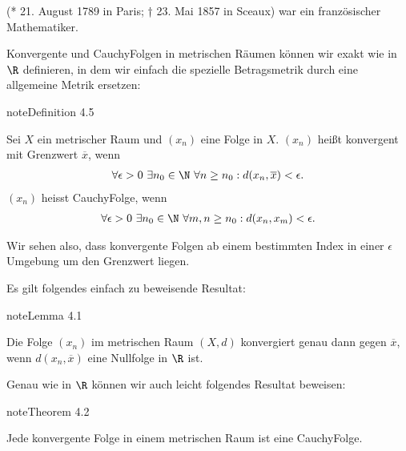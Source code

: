 \documentclass[letterpaper,10pt,english]{jupyterBook}
\begin{document}
\begin{sphinxShadowBox}

 (* 21. August 1789 in Paris; † 23. Mai 1857 in Sceaux) war ein französischer Mathematiker.
\end{sphinxShadowBox}

Konvergente und Cauchy\sphinxhyphen{}Folgen in metrischen Räumen können wir exakt wie in \(\R\) definieren, in dem wir einfach die spezielle Betragsmetrik durch eine allgemeine Metrik ersetzen:
\label{metrik/konvfolgen:definition-4}
\begin{sphinxadmonition}{note}{Definition 4.5}



Sei \(X\) ein metrischer Raum und \((x_n)\) eine Folge in \(X\). \((x_n)\) heißt konvergent mit Grenzwert \(\overline{x}\), wenn
\begin{equation*}
\begin{split} \forall \epsilon  >0 ~\exists n_0 \in \N ~\forall n \geq n_0: d(x_n, \overline{x}) < \epsilon.\end{split}
\end{equation*}
\((x_n)\) heisst Cauchy\sphinxhyphen{}Folge, wenn
\begin{equation*}
\begin{split} \forall \epsilon  >0 ~\exists n_0 \in \N ~\forall m,n \geq n_0: d(x_n, x_m) < \epsilon.\end{split}
\end{equation*}\end{sphinxadmonition}

Wir sehen also, dass konvergente Folgen ab einem bestimmten Index in einer \(\epsilon\)\sphinxhyphen{}Umgebung um den Grenzwert liegen.

Es gilt folgendes einfach zu beweisende Resultat:
\label{metrik/konvfolgen:nullfolgenmetrik}
\begin{sphinxadmonition}{note}{Lemma 4.1}



Die Folge \((x_n)\) im metrischen Raum \((X,d)\) konvergiert genau dann gegen \(\overline{x}\), wenn \(d(x_n,\overline{x})\) eine Nullfolge in \(\R\) ist.
\end{sphinxadmonition}

Genau wie in \(\R\) können wir auch leicht folgendes Resultat beweisen:
\label{metrik/konvfolgen:theorem-6}
\begin{sphinxadmonition}{note}{Theorem 4.2}



Jede konvergente Folge in einem metrischen Raum ist eine Cauchy\sphinxhyphen{}Folge.
\end{sphinxadmonition}
\end{document}
